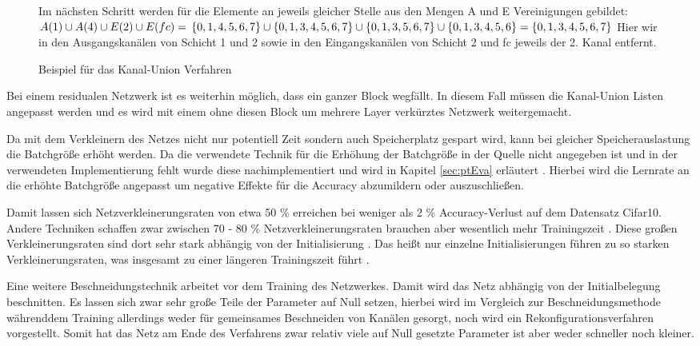\begin{figure}[htbp]
{\begin{minipage}[t]{0.65\textwidth}
Im nächsten Schritt werden für die Elemente an jeweils gleicher Stelle aus den Mengen A und E Vereinigungen gebildet:\\
$A(1)\cup A(4) \cup E(2) \cup E(fc)=\\
\left\{0,1,4,5,6,7\right\} \cup \left\{0,1,3,4,5,6,7\right\} \cup \left\{0,1,3,5,6,7\right\} \cup \left\{0,1,3,4,5,6\right\} = \left\{ 0,1,3,4,5,6,7\right\}$
Hier wir in den Ausgangskanälen von Schicht 1 und 2 sowie in den Eingangskanälen von Schicht 2 und fc jeweils der 2. Kanal entfernt.

\end{minipage}
}
\caption{Beispiel für das Kanal-Union Verfahren}

\end{figure}



Bei einem residualen Netzwerk ist es weiterhin möglich, dass ein ganzer Block wegfällt. In diesem Fall müssen die Kanal-Union Listen angepasst werden und es wird mit einem ohne diesen Block um mehrere Layer verkürztes Netzwerk weitergemacht.


Da mit dem Verkleinern des Netzes nicht nur potentiell Zeit sondern auch Speicherplatz gespart wird, kann bei gleicher Speicherauslastung die Batchgröße erhöht werden. Da die verwendete Technik für die Erhöhung der Batchgröße in der Quelle nicht angegeben ist und in der verwendeten Implementierung fehlt wurde diese nachimplementiert und wird in Kapitel \ref{sec:ptEva} erläutert \cite{ptImpl}. Hierbei wird die Lernrate an die erhöhte Batchgröße angepasst um negative Effekte für die Accuracy abzumildern oder auszuschließen. 

Damit lassen sich Netzverkleinerungsraten von etwa 50 \% erreichen bei weniger als 2 \% Accuracy-Verlust auf dem Datensatz Cifar10. Andere Techniken schaffen zwar zwischen 70 - 80 \% Netzverkleinerungsraten brauchen aber wesentlich mehr Trainingszeit \cite{lottery}. Diese großen Verkleinerungsraten sind dort sehr stark abhängig von der Initialisierung \cite{lottery}. Das heißt nur einzelne Initialisierungen führen zu so starken Verkleinerungsraten, was insgesamt zu einer längeren Trainingszeit führt \cite{lottery}. 


Eine weitere Beschneidungstechnik arbeitet vor dem Training des Netzwerkes\cite{snyc}. Damit wird das Netz abhängig von der Initialbelegung beschnitten. Es lassen sich zwar sehr große Teile der Parameter auf Null setzen, hierbei wird im Vergleich zur Beschneidungsmethode währenddem Training allerdings weder für gemeinsames Beschneiden von Kanälen gesorgt, noch wird ein Rekonfigurationsverfahren vorgestellt. Somit hat das Netz am Ende des Verfahrens zwar relativ viele auf Null gesetzte Parameter ist aber weder schneller noch kleiner.


